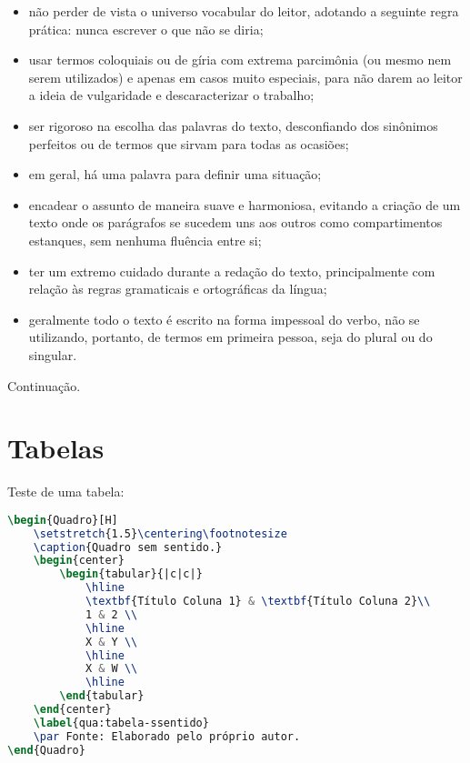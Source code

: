 \begin{itemize}
    \item não perder de vista o universo vocabular do leitor, adotando a seguinte regra prática: nunca escrever o que não se diria;

    \item usar termos coloquiais ou de gíria com extrema parcimônia (ou mesmo nem serem utilizados) e apenas em casos muito especiais, para não darem ao leitor a ideia de vulgaridade e descaracterizar o trabalho;

    \item ser rigoroso na escolha das palavras do texto, desconfiando dos sinônimos perfeitos ou de termos que sirvam para todas as ocasiões;

    \item em geral, há uma palavra para definir uma situação;

    \item encadear o assunto de maneira suave e harmoniosa, evitando a criação de um texto onde os parágrafos se sucedem uns aos outros como compartimentos estanques, sem nenhuma fluência entre si;

    \item ter um extremo cuidado durante a redação do texto, principalmente com relação às regras gramaticais e ortográficas da língua;

    \item geralmente todo o texto é escrito na forma impessoal do verbo, não se utilizando, portanto, de termos em primeira pessoa, seja do plural ou do singular.

\end{itemize}

Continuação.

\section{Tabelas}

Teste de uma tabela:

\begin{lstlisting}[language=TeX, caption={Code Sem Sentido}]
\begin{Quadro}[H]
    \setstretch{1.5}\centering\footnotesize
    \caption{Quadro sem sentido.}
    \begin{center}
        \begin{tabular}{|c|c|}
            \hline
            \textbf{Título Coluna 1} & \textbf{Título Coluna 2}\\
            1 & 2 \\
            \hline
            X & Y \\
            \hline
            X & W \\
            \hline
        \end{tabular}
    \end{center}
    \label{qua:tabela-ssentido}
    \par Fonte: Elaborado pelo próprio autor.
\end{Quadro}
\end{lstlisting}


